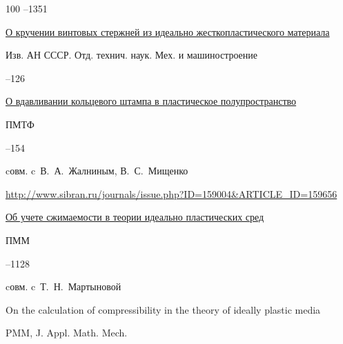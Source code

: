 \begin{thebibliography}{100}
--1351 








\paper \href{https://zbmath.org/?q=an:0112.17504}{О кручении винтовых стержней из идеально жесткопластического материала}

\jour Изв. АН СССР. Отд. технич. наук. Мех. и машиностроение



–126





\paper \href{https://zbmath.org/?q=an:0098.38105}{О вдавливании кольцевого штампа в пластическое полупространство}

\jour ПМТФ



–154 

\miscnote cовм. c~В.~А.~Жалниным, В.~С.~Мищенко


\elink \url{http://www.sibran.ru/journals/issue.php?ID=159004&ARTICLE_ID=159656}




\paper \href{https://zbmath.org/?q=an:0106.38103}{Об учете сжимаемости в теории идеально пластических сред}

\jour ПММ




–1128 

\miscnote cовм. c~Т.~Н.~Мартыновой


\transl


\transl

\paper On the calculation of compressibility in the theory of ideally plastic media

\jour PMM, J. Appl. Math. Mech.


\end{thebibliography}
